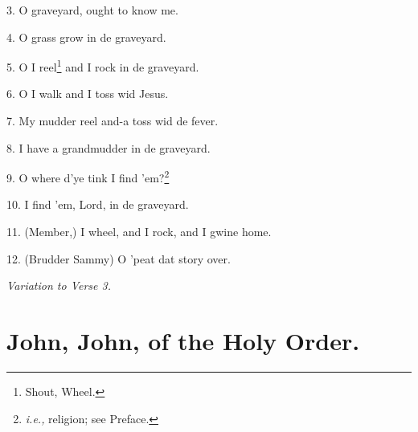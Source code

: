 \documentclass[a5paper,10pt]{book}
\begin{document}
\begin{stanza}
\item[3.]
  O graveyard, ought to know me.

\item[4.]
  O grass grow in de graveyard.

\item[5.]
  O I reel\footnote[2]{Shout, Wheel.} and I rock in de graveyard.

\item[6.]
  O I walk and I toss wid Jesus.

\item[7.]
  My mudder reel and-a toss wid de fever.

\item[8.]
  I have a grandmudder in de graveyard.

\item[9.]
  O where d'ye tink I find 'em?\footnote[3]{\emph{i.e.,} religion; see Preface.}

\item[10.]
  I find 'em, Lord, in de graveyard.

\item[11.]
  (Member,) I wheel, and I rock, and I gwine home.

\item[12.]
  (Brudder Sammy) O 'peat dat story over.
\end{stanza}

\begin{extra}
\emph{Variation to Verse 3.}

\medskip
{}
\end{extra}


\newpage
\section{John, John, of the Holy Order.}
\thispagestyle{empty}
\end{document}

